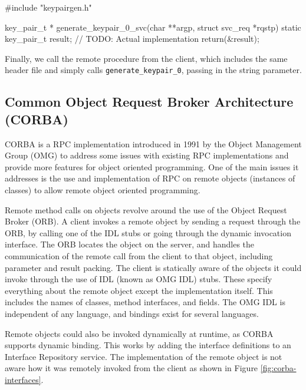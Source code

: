 \begin{code}
#include "keypairgen.h"

key_pair_t *
generate_keypair_0_svc(char **argp, struct svc_req *rqstp)
{
  static key_pair_t  result;
  // TODO: Actual implementation
  return(&result);
}
\end{code}

Finally, we call the remote procedure from the client, which includes the same header file and simply calls \lstinline+generate_keypair_0+, passing in the string parameter.



\subsection{Common Object Request Broker Architecture (CORBA)} %
\label{sub:corba_intro}

CORBA is a RPC implementation introduced in 1991 by the Object Management Group (OMG) to address some issues with existing RPC implementations and provide more features for object oriented programming. One of the main issues it addresses is the use and implementation of RPC on remote objects (instances of classes) to allow remote object oriented programming. 

Remote method calls on objects revolve around the use of the Object Request Broker (ORB)\cite{isocorba}. A client invokes a remote object by sending a request through the ORB, by calling one of the IDL stubs or going through the dynamic invocation interface. The ORB locates the object on the server, and handles the communication of the remote call from the client to that object, including parameter and result packing. The client is statically aware of the objects it could invoke through the use of IDL (known as OMG IDL) stubs. These specify everything about the remote object except the implementation itself. This includes the names of classes, method interfaces, and fields. The OMG IDL is independent of any language, and bindings exist for several languages. 

Remote objects could also be invoked dynamically at runtime, as CORBA supports dynamic binding. This works by adding the interface definitions to an Interface Repository service. The implementation of the remote object is not aware how it was remotely invoked from the client as shown in Figure \ref{fig:corba-interfaces}.

